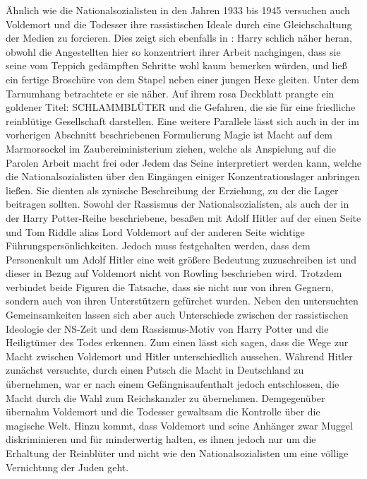 Ähnlich wie die Nationalsozialisten in den Jahren 1933 bis 1945 versuchen auch Voldemort und die Todesser ihre rassistischen Ideale durch eine \glqq Gleichschaltung\grqq{} der Medien zu forcieren.
Dies zeigt sich ebenfalls in \cite[S.256]{JKR10}: \glqq Harry schlich näher heran, obwohl die Angestellten hier so konzentriert ihrer Arbeit nachgingen, dass sie seine vom Teppich gedämpften Schritte wohl kaum bemerken würden, und ließ ein fertige Broschüre von dem Stapel neben einer jungen Hexe gleiten. Unter dem Tarnumhang betrachtete er sie näher. Auf ihrem rosa Deckblatt prangte ein goldener Titel: SCHLAMMBLÜTER und die Gefahren, die sie für eine friedliche reinblütige Gesellschaft darstellen\grqq.
Eine weitere Parallele lässt sich auch in der im vorherigen Abschnitt beschriebenen Formulierung \glqq Magie ist Macht\grqq{} auf dem Marmorsockel im Zaubereiministerium ziehen, welche als Anspielung auf die Parolen  \glqq Arbeit macht frei\grqq{} oder \glqq Jedem das Seine\grqq{} interpretiert werden kann, welche die Nationalsozialisten über den Eingängen einiger Konzentrationslager anbringen ließen.
Sie dienten als zynische Beschreibung der \glqq Erziehung\grqq, zu der die Lager beitragen sollten.
Sowohl der Rassismus der Nationalsozialisten, als auch der in der \glqq Harry Potter\grqq{}-Reihe beschriebene, besaßen mit Adolf Hitler auf der einen Seite und Tom Riddle alias Lord Voldemort auf der anderen Seite wichtige Führungspersönlichkeiten.
Jedoch muss festgehalten werden, dass dem Personenkult um Adolf Hitler eine weit größere Bedeutung zuzuschreiben ist und dieser in Bezug auf Voldemort nicht von Rowling beschrieben wird.
Trotzdem verbindet beide Figuren die Tatsache, dass sie nicht nur von ihren Gegnern, sondern auch von ihren Unterstützern gefürchet wurden\cite[S.15]{JKR10}. 
Neben den untersuchten Gemeinsamkeiten lassen sich aber auch  Unterschiede zwischen der rassistischen Ideologie der NS-Zeit und dem Rassismus-Motiv von \glqq Harry Potter und die Heiligtümer des Todes\grqq{} erkennen.
Zum einen lässt sich sagen, dass die Wege zur Macht zwischen Voldemort und Hitler unterschiedlich aussehen.
Während Hitler zunächst versuchte, durch einen Putsch die Macht in Deutschland zu übernehmen, war er nach einem Gefängnisaufenthalt jedoch entschlossen, die Macht durch die Wahl zum Reichskanzler zu übernehmen\cite[S.1-99]{MW121}. 
Demgegenüber übernahm Voldemort und die Todesser gewaltsam die Kontrolle über die magische Welt\cite[S.13]{JKR10}. 
Hinzu kommt, dass Voldemort und seine Anhänger zwar Muggel diskriminieren und für minderwertig halten, es ihnen jedoch nur um die Erhaltung der Reinblüter und nicht wie den Nationalsozialisten um eine völlige Vernichtung der Juden geht\cite[S.43]{MW123}.
